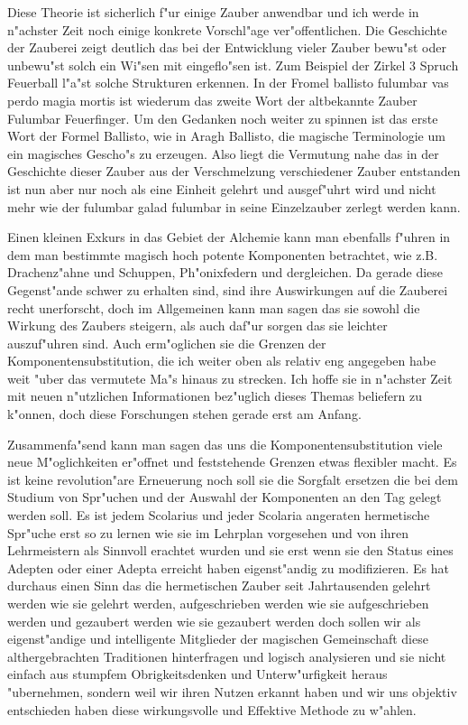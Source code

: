 \documentclass[a5paper,8pt]{book}
\begin{document}
Diese Theorie ist sicherlich f"ur einige Zauber anwendbar und ich werde in n"achster Zeit noch einige konkrete Vorschl"age ver"offentlichen. Die Geschichte der Zauberei zeigt deutlich das bei der Entwicklung vieler Zauber bewu"st oder unbewu"st solch ein Wi"sen mit eingeflo"sen ist. Zum Beispiel der Zirkel 3 Spruch Feuerball l"a"st solche Strukturen erkennen. In der Fromel ballisto fulumbar vas perdo magia mortis ist wiederum das zweite Wort der altbekannte Zauber Fulumbar Feuerfinger. Um den Gedanken noch weiter zu spinnen ist das erste Wort der Formel Ballisto, wie in Aragh Ballisto, die magische Terminologie um ein magisches Gescho"s zu erzeugen. Also liegt die Vermutung nahe das in der Geschichte dieser Zauber aus der Verschmelzung verschiedener Zauber entstanden ist nun aber nur noch als eine Einheit gelehrt und ausgef"uhrt wird und nicht mehr wie der fulumbar galad fulumbar in seine Einzelzauber zerlegt werden kann.

Einen kleinen Exkurs in das Gebiet der Alchemie kann man ebenfalls f"uhren in dem man bestimmte magisch hoch potente Komponenten betrachtet, wie z.B. Drachenz"ahne und Schuppen, Ph"onixfedern und dergleichen. Da gerade diese Gegenst"ande schwer zu erhalten sind, sind ihre Auswirkungen auf die Zauberei recht unerforscht, doch im Allgemeinen kann man sagen das sie sowohl die Wirkung des Zaubers steigern, als auch daf"ur sorgen das sie leichter auszuf"uhren sind. Auch erm"oglichen sie die Grenzen der Komponentensubstitution, die ich weiter oben als relativ eng angegeben habe weit "uber das vermutete Ma"s hinaus zu strecken. Ich hoffe sie in n"achster Zeit mit neuen n"utzlichen Informationen bez"uglich dieses Themas beliefern zu k"onnen, doch diese Forschungen stehen gerade erst am Anfang.

\vspace{10mm}

Zusammenfa"send kann man sagen das uns die Komponentensubstitution viele neue M"oglichkeiten er"offnet und feststehende Grenzen etwas flexibler macht. Es ist keine revolution"are Erneuerung noch soll sie die Sorgfalt ersetzen die bei dem Studium von Spr"uchen und der Auswahl der Komponenten an den Tag gelegt werden soll. Es ist jedem Scolarius und jeder Scolaria angeraten hermetische Spr"uche erst so zu lernen wie sie im Lehrplan vorgesehen und von ihren Lehrmeistern als Sinnvoll erachtet wurden und sie erst wenn sie den Status eines Adepten oder einer Adepta erreicht haben eigenst"andig zu modifizieren. Es hat durchaus einen Sinn das die hermetischen Zauber seit Jahrtausenden gelehrt werden wie sie gelehrt werden, aufgeschrieben werden wie sie aufgeschrieben werden und gezaubert werden wie sie gezaubert werden doch sollen wir als eigenst"andige und intelligente Mitglieder der magischen Gemeinschaft diese althergebrachten Traditionen hinterfragen und logisch analysieren und sie nicht einfach aus stumpfem 
Obrigkeitsdenken und Unterw"urfigkeit heraus "ubernehmen, sondern weil wir ihren Nutzen erkannt haben und wir uns objektiv entschieden haben diese wirkungsvolle und Effektive Methode zu w"ahlen.
\end{document}

